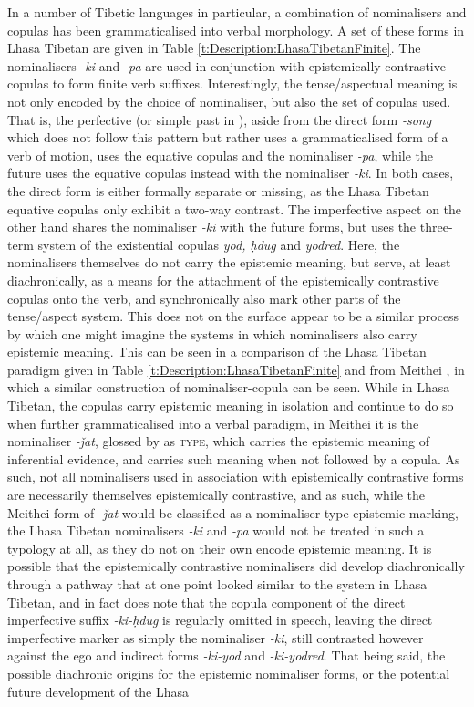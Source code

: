 In a number of Tibetic languages in particular, a combination of nominalisers and copulas has been grammaticalised into verbal morphology. A set of these forms in Lhasa Tibetan are given in Table \ref{t:Description:LhasaTibetanFinite}. The nominalisers \textit{-ki} and \textit{-pa} are used in conjunction with epistemically contrastive copulas to form finite verb suffixes. Interestingly, the tense/aspectual meaning is not only encoded by the choice of nominaliser, but also the set of copulas used. That is, the perfective (or simple past in ), aside from the direct form \textit{-song} which does not follow this pattern but rather uses a grammaticalised form of a verb of motion, uses the equative copulas and the nominaliser \textit{-pa}, while the future uses the equative copulas instead with the nominaliser \textit{-ki}. In both cases, the direct form is either formally separate or missing, as the Lhasa Tibetan equative copulas only exhibit a two-way contrast. The imperfective aspect on the other hand shares the nominaliser \textit{-ki} with the future forms, but uses the three-term system of the existential copulas \textit{yod, ḥdug} and \textit{yodred}. Here, the nominalisers themselves do not carry the epistemic meaning, but serve, at least diachronically, as a means for the attachment of the epistemically contrastive copulas onto the verb, and synchronically also mark other parts of the tense/aspect system. This does not on the surface appear to be a similar process by which one might imagine the systems in which nominalisers also carry epistemic meaning. This can be seen in a comparison of the Lhasa Tibetan paradigm given in Table \ref{t:Description:LhasaTibetanFinite} and  from Meithei \cite[Internal Isolate: India,][296]{Chelliah1997}, in which a similar construction of nominaliser-copula can be seen. While in Lhasa Tibetan, the copulas carry epistemic meaning in isolation and continue to do so when further grammaticalised into a verbal paradigm, in Meithei it is the nominaliser \textit{-ǰat}, glossed by  as \textsc{type}, which carries the epistemic meaning of inferential evidence, and carries such meaning when not followed by a copula. As such, not all nominalisers used in association with epistemically contrastive forms are necessarily themselves epistemically contrastive, and as such, while the Meithei form of \textit{-ǰat} would be classified as a nominaliser-type epistemic marking, the Lhasa Tibetan nominalisers \textit{-ki} and \textit{-pa} would not be treated in such a typology at all, as they do not on their own encode epistemic meaning. It is possible that the epistemically contrastive nominalisers did develop diachronically through a pathway that at one point looked similar to the system in Lhasa Tibetan, and in fact  does note that the copula component of the direct imperfective suffix \textit{-ki-ḥdug} is regularly omitted in speech, leaving the direct imperfective marker as simply the nominaliser \textit{-ki}, still contrasted however against the ego and indirect forms \textit{-ki-yod} and \textit{-ki-yodred}. That being said, the possible diachronic origins for the epistemic nominaliser forms, or the potential future development of the Lhasa 